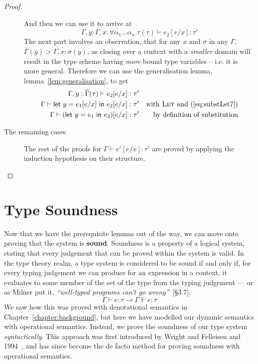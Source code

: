 \begin{proof}
\begin{description}
  And then we can use it to arrive at
  \[ \Gamma , y : \overline{\Gamma, x : \forall\alpha_1\ldots\alpha_n.\tau}(\tau) \vdash e_2 [e/x] : \tau' \]
  The next part involves an observation, that for any $x$ and $\sigma$ in
  any $\Gamma$, ${\overline{\Gamma}(y) > \overline{\Gamma, x : \sigma}(y)}$, as closing
  over a context with a \textit{smaller} domain will result in the
  type scheme having \textit{more} bound type variables -- i.e. it is
  more general. Therefore we can use the generalisation lemma,
  lemma~\ref{lem:generalisation}, to get
  \begin{align*}
    \Gamma , y : \overline{\Gamma}(\tau) \vdash e_2[e/x] : \tau' \\
    \Gamma \vdash \mathsf{let} \ y = e_1[e/x] \ \mathsf{in} \ e_2[e/x] : \tau' && \text{with \textsc{Let}
                                               and
                                               (\ref{eq:substLet7})}
    \\
    \Gamma \vdash (\mathsf{let} \ y = e_1 \ \mathsf{in} \ e_2)[e/x] : \tau' && \text{by definition of substitution}
  \end{align*}
  
  \item[The remaining cases] The rest of the proofs for $\Gamma \vdash e'[e/x] :
    \tau'$ are proved by applying the induction hypothesis on their structure.
  \end{description}
\end{proof}

\section{Type Soundness}

Now that we have the prerequisite lemmas out of the way, we can move
onto proving that the system is \textbf{sound}. Soundness is a
property of a logical system, stating that every judgement that can be
proved within the system is valid. In the type theory realm, a type
system is considered to be sound if and only if, for every typing
judgement we can produce for an expression in a context, it evaluates
to some member of the set of the type from the typing judgement --- or
as Milner put it, \textit{``well-typed programs can't go
  wrong''}~\cite{milner1978}[§3.7].
\[\Gamma \vdash e : \tau \rightarrow \Gamma \Vdash e : \tau\]
We saw how this was proved with denotational semantics in
Chapter~\ref{chapter:background}, but here we have modelled our
dynamic semantics with operational semantics.  Instead, we prove the
soundness of our type system \textit{syntactically}. This approach was
first introduced by Wright and Felleisen and 1994~\cite{wright1994},
and has since become the de facto method for proving soundness
with operational semantics.

